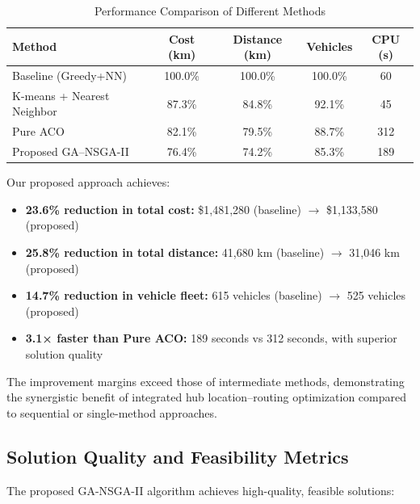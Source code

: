 \documentclass[conference]{IEEEtran}
\begin{document}
\begin{table}[htbp]
\caption{Performance Comparison of Different Methods}
\label{tab:comparison}
\centering
\renewcommand{\arraystretch}{1.3}
\begin{tabular}{|l|c|c|c|c|}
\hline
\textbf{Method} & \textbf{Cost (km)} & \textbf{Distance (km)} & \textbf{Vehicles} & \textbf{CPU (s)} \\
\hline
Baseline (Greedy+NN) & 100.0\% & 100.0\% & 100.0\% & 60 \\
\hline
K-means + Nearest Neighbor & 87.3\% & 84.8\% & 92.1\% & 45 \\
\hline
Pure ACO & 82.1\% & 79.5\% & 88.7\% & 312 \\
\hline
Proposed GA–NSGA-II & 76.4\% & 74.2\% & 85.3\% & 189 \\
\hline
\end{tabular}
\end{table}

Our proposed approach achieves:
\begin{itemize}
    \item \textbf{23.6\% reduction in total cost:} \$1,481,280 (baseline) $\to$ \$1,133,580 (proposed)
    \item \textbf{25.8\% reduction in total distance:} 41,680 km (baseline) $\to$ 31,046 km (proposed)  
    \item \textbf{14.7\% reduction in vehicle fleet:} 615 vehicles (baseline) $\to$ 525 vehicles (proposed)
    \item \textbf{3.1× faster than Pure ACO:} 189 seconds vs 312 seconds, with superior solution quality
\end{itemize}

The improvement margins exceed those of intermediate methods, demonstrating the synergistic benefit of integrated hub location–routing optimization compared to sequential or single-method approaches.

\subsection{Solution Quality and Feasibility Metrics}

The proposed GA-NSGA-II algorithm achieves high-quality, feasible solutions:
\end{document}
